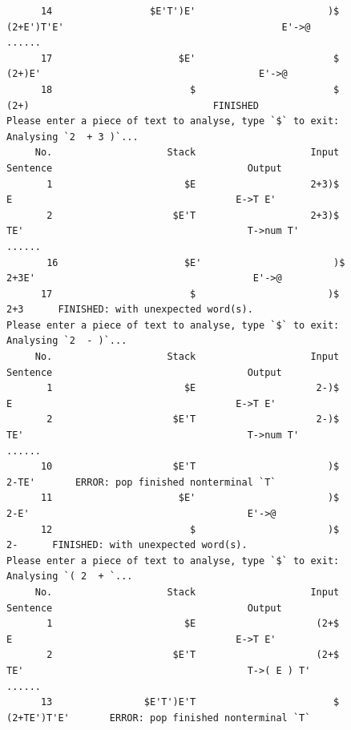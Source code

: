 \documentclass[UTF8]{ctexart}
\begin{document}
\begin{lstlisting}
      14                 $E'T')E'                       )$                           (2+E')T'E'                                      E'->@
......
      17                      $E'                        $                          (2+)E'                                      E'->@
      18                        $                        $                          (2+)                                FINISHED
Please enter a piece of text to analyse, type `$` to exit:
Analysing `2  + 3 )`...
     No.                    Stack                    Input                      Sentence                                  Output
       1                       $E                    2+3)$                              E                                       E->T E'
       2                     $E'T                    2+3)$                              TE'                                       T->num T'
......
       16                      $E'                       )$                           2+3E'                                      E'->@
      17                        $                       )$                           2+3      FINISHED: with unexpected word(s).
Please enter a piece of text to analyse, type `$` to exit:
Analysing `2  - )`...
     No.                    Stack                    Input                      Sentence                                  Output
       1                       $E                     2-)$                              E                                       E->T E'
       2                     $E'T                     2-)$                              TE'                                       T->num T'
......
      10                     $E'T                       )$                            2-TE'       ERROR: pop finished nonterminal `T`
      11                      $E'                       )$                            2-E'                                      E'->@
      12                        $                       )$                            2-      FINISHED: with unexpected word(s).
Please enter a piece of text to analyse, type `$` to exit:
Analysing `( 2  + `...
     No.                    Stack                    Input                      Sentence                                  Output
       1                       $E                     (2+$                              E                                       E->T E'
       2                     $E'T                     (2+$                              TE'                                       T->( E ) T'
......
      13                $E'T')E'T                        $                           (2+TE')T'E'       ERROR: pop finished nonterminal `T`

\end{lstlisting}
\end{document}
